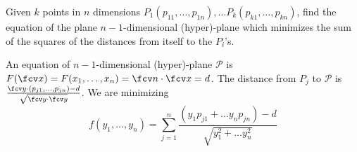 \begin{frame}
\begin{example}
Given $k$ points in $n$ dimensions $P_1(p_{11},\dots, p_{1n}),\dots P_{k}(p_{k1},\dots, p_{kn})$, find the equation of the plane $n-1$-dimensional (hyper)-plane which minimizes the sum of the squares of the distances from itself to the $P_i$'s.

An equation of $n-1$-dimensional (hyper)-plane $\mathcal P$ is $F(\fcv x)=F(x_1, \dots, x_n) = \fcv n\cdot \fcv x= d$. The distance from $P_j$ to $\mathcal P$ is $\frac{\fcv y\cdot ( p_{j1},\dots, p_{jn}) -d}{ \sqrt{\fcv y\cdot \fcv y}}$. We are minimizing
\[
f( y_1,\dots, y_n)= \sum_{j=1}^{n} \frac{\left( y_1p_{j1}+\dots y_np_{jn}\right)-d}{\sqrt{y_1^2+\dots y_n^2}}
\]
\end{example}
\end{frame}
